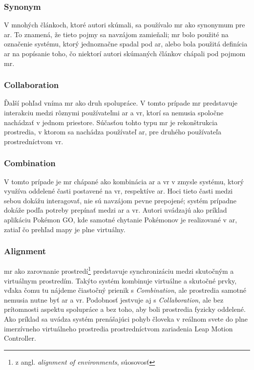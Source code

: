 \subsubsection*{Synonym}
V mnohých článkoch, ktoré autori \cite{speicherWhatMixedReality2019a} skúmali, sa používalo \acrshort{mr} ako synonymum pre \acrshort{ar}. To znamená, že tieto pojmy sa 
navzájom zamieňali; \acrshort{mr} bolo použité na označenie systému, ktorý jednoznačne spadal pod \acrshort{ar}, alebo bola použitá definícia \acrshort{ar} na popísanie toho,
čo niektorí autori skúmaných článkov chápali pod pojmom \acrshort{mr}.

\subsubsection*{Collaboration}
Ďalší pohľad vníma \acrshort{mr} ako druh spolupráce. V tomto prípade \acrshort{mr} predstavuje interakciu medzi rôznymi používateľmi \acrshort{ar} a \acrshort{vr}, ktorí
sa nemusia spoločne nachádzať v jednom priestore. Súčasťou tohto typu \acrshort{mr} je rekonštrukcia prostredia, v ktorom sa nachádza používateľ \acrshort{ar}, pre druhého
používateľa prostredníctvom \acrshort{vr}.

\subsubsection*{Combination}
V tomto prípade je \acrshort{mr} chápané ako kombinácia \acrshort{ar} a \acrshort{vr} v zmysle systému, ktorý využíva oddelené časti postavené na \acrshort{vr}, respektíve
\acrshort{ar}. Hoci tieto časti medzi sebou dokážu interagovať, nie sú navzájom pevne prepojené; systém prípadne dokáže podľa potreby prepínať medzi \acrshort{ar} a
\acrshort{vr}. Autori \cite{speicherWhatMixedReality2019a} uvádzajú ako príklad aplikáciu Pokémon GO, kde samotné chytanie Pokémonov je realizované v \acrshort{ar}, zatiaľ čo 
prehľad mapy je plne virtuálny.

\subsubsection*{Alignment}
\acrshort{mr} ako zarovnanie prostredí\footnote{z angl. \emph{alignment of environments}, súosovosť} predstavuje synchronizáciu medzi skutočným a virtuálnym prostredím.
Takýto systém kombinuje virtuálne a skutočné prvky, vďaka čomu tu nájdeme čiastočný prienik s \emph{Combination}, ale prostredia samotné nemusia nutne byť \acrshort{ar}
a \acrshort{vr}. Podobnosť jestvuje aj s \emph{Collaboration}, ale bez prítomnosti aspektu spolupráce a bez toho, aby boli prostredia fyzicky oddelené. Ako príklad sa 
uvádza systém prenášajúci pohyb človeka v reálnom svete do plne imerzívneho virtuálneho prostredia prostredníctvom zariadenia Leap Motion Controller.

